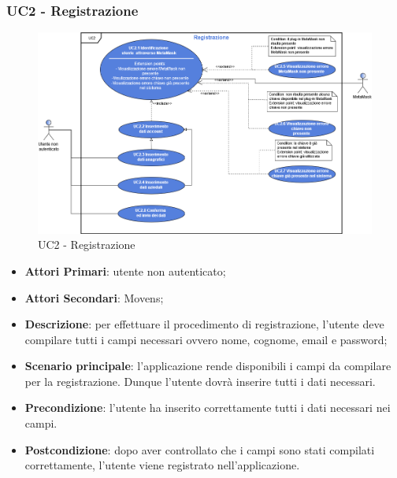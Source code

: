 \subsubsection{UC2 - Registrazione}
\begin{figure}[h]
	\includegraphics[width=16cm]{res/images/UC2Registrazione.png}
	\centering
	\caption{UC2 - Registrazione}
\end{figure}
\begin{itemize}
	\item \textbf{Attori Primari}: utente non autenticato;
	\item \textbf{Attori Secondari}: Movens\glo;
	\item \textbf{Descrizione}: per effettuare il procedimento di registrazione, l'utente deve compilare tutti i campi necessari ovvero nome, cognome, email e password;
	\item \textbf{Scenario principale}: l'applicazione rende disponibili i campi da compilare per la registrazione. Dunque l'utente dovrà inserire tutti i dati necessari.
		
	\item \textbf{Precondizione}: l'utente ha inserito correttamente tutti i dati necessari nei campi.
	\item \textbf{Postcondizione}: dopo aver controllato che i campi sono stati compilati correttamente, l'utente viene registrato nell'applicazione. 
	
\end{itemize}
